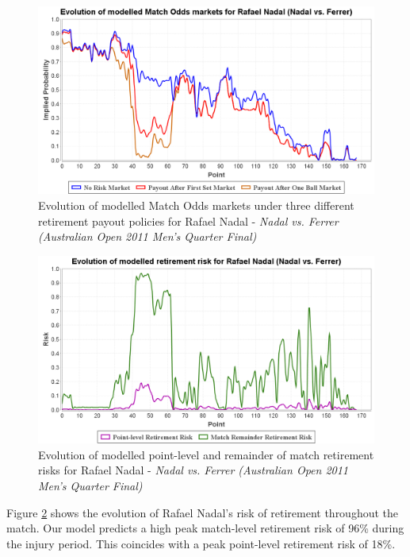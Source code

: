 \documentclass[authoryear, 12pt]{elsarticle}
\begin{document}
\begin{figure}[H]
  \centering \includegraphics[width=12.3cm]{matches/nadalferrermodel}
  \caption{Evolution of modelled Match Odds markets under three different retirement payout policies for Rafael Nadal - \textit{Nadal vs. Ferrer (Australian Open 2011 Men's Quarter Final)}}
  \label{nadalferrermodel}
\end{figure}

\begin{figure}[H]
  \centering \includegraphics[width=12.3cm]{matches/nadalferrerrisk}
  \caption{Evolution of modelled point-level and remainder of match retirement risks for Rafael Nadal - \textit{Nadal vs. Ferrer (Australian Open 2011 Men's Quarter Final)}}
  \label{nadalferrerrisk}
\end{figure}

Figure \ref{nadalferrerrisk} shows the evolution of Rafael Nadal's risk of retirement throughout the match.  Our model predicts a high peak match-level retirement risk of 96\% during the injury period.  This coincides with a peak point-level retirement risk of 18\%.
\end{document}
